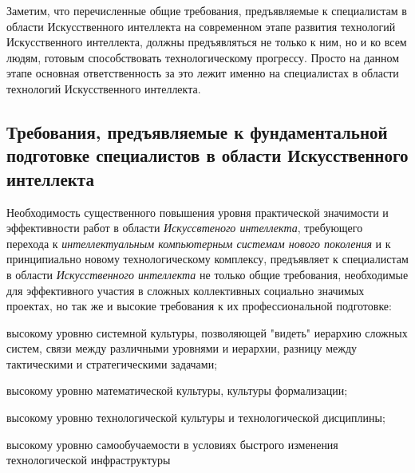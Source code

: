 Заметим, что перечисленные общие требования, предъявляемые к специалистам в области Искусственного интеллекта на современном этапе развития технологий Искусственного интеллекта, должны предъявляться не только к ним, но и ко всем людям, готовым способствовать технологическому прогрессу. Просто на данном этапе основная ответственность за это лежит именно на специалистах в области технологий Искусственного интеллекта.

\subsection*{Требования, предъявляемые к фундаментальной подготовке специалистов в области Искусственного интеллекта}
Необходимость существенного повышения уровня практической значимости и эффективности работ в области \textit{Искуссвтеного интеллекта}, требующего перехода к \textit{интеллектуальным компьютерным системам нового поколения} и к принципиально новому технологическому комплексу, предъявляет к специалистам в области \textit{Искусственного интеллекта} не только общие требования, необходимые для эффективного участия в сложных коллективных социально значимых проектах, но так же и высокие требования к их  профессиональной подготовке:
\begin{textitemize}
	\item высокому уровню системной культуры, позволяющей "видеть"{} иерархию сложных систем, связи между различными уровнями и иерархии, разницу между тактическими и стратегическими задачами;
	\item высокому уровню математической культуры, культуры формализации;
	\item высокому уровню технологической культуры и технологической дисциплины;
	\item высокому уровню самообучаемости в условиях быстрого изменения технологической инфраструктуры
\end{textitemize}

